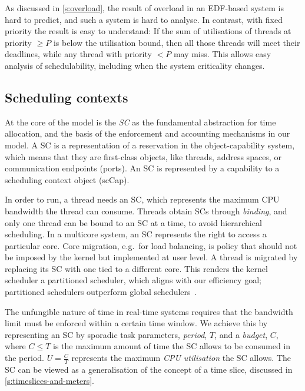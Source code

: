 As discussed in \autoref{s:overload}, the result of overload in an
EDF-based system is hard to predict, and such a system is hard to
analyse. In contrast, with fixed priority the result is easy to
understand: If the sum of utilisations of threads at priority \(\geq
P\) is below the utilisation bound, then all those threads will meet
their deadlines, while any thread with priority \(<P\) may miss. This
allows easy analysis of schedulability, including when the system
criticality changes.

\subsection{Scheduling contexts}
\label{sec:model-scheduling-contexts}

At the core of the model is the \emph{\gls{SC}} as the
fundamental abstraction for time allocation, and the basis of 
the enforcement and accounting mechanisms in our model.
A \gls{SC} is a representation
of a reservation in the object-capability system, which means that 
they are first-class objects, like threads, address spaces, or
communication endpoints (ports). An SC is represented by a capability to a
scheduling context object (scCap).

In order to run, a thread needs an \gls{SC}, which represents the
maximum CPU bandwidth the thread can consume. Threads obtain \glspl{SC} through \emph{binding}, and
only one thread can be bound to an \gls{SC} at a time, to avoid hierarchical scheduling.
In a multicore system, an SC represents the right to access a
particular core. Core migration, e.g.\ for load balancing, is policy
that should not be imposed by the kernel but implemented at user
level. A thread is migrated by replacing its SC with one tied to a
different core. This renders the kernel scheduler a partitioned scheduler, 
which aligns with our efficiency goal; partitioned schedulers outperform global
schedulers~\citep{Brandenburg:phd}.

The unfungible nature of time in real-time systems requires that the
bandwidth limit must be enforced within a certain time window. We
achieve this by representing an SC by sporadic task parameters, \emph{period}, \(T\), and a
\emph{budget}, \(C\), where \(C\leq T\) is the maximum amount of time
the SC allows to be consumed in the period. \(U=\frac{C}{T}\) represents the
maximum \emph{CPU utilisation} the SC allows. The SC can be viewed as
a generalisation of the concept of a time slice, discussed in \cref{s:timeslices-and-meters}.

